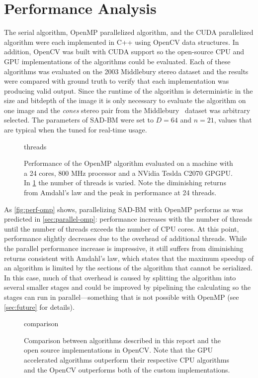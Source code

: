 \documentclass{article}
\let\orgautoref\autoref
\providecommand{\Cref}
        {\def\equationautorefname{Equation}%
         \def\figureautorefname{Figure}%
         \def\subfigureautorefname{Figure}%
         \def\Itemautorefname{Item}%
         \def\tableautorefname{Table}%
         \def\sectionautorefname{Section}%
         \def\subsectionautorefname{Section}%
         \def\subsubsectionautorefname{Section}%
         \def\chapterautorefname{Section}%
         \def\partautorefname{Part}%
         \orgautoref}
\begin{document}
\section{Performance Analysis}
\label{sec:perf}
The serial algorithm, OpenMP parallelized algorithm, and the CUDA parallelized
algorithm were each implemented in C++ using OpenCV data structures. In
addition, OpenCV was built with CUDA support so the open-source CPU and GPU
implementations of the algorithms could be evaluated. Each of these algorithms
was evaluated on the 2003 Middlebury stereo dataset and the results were
compared with ground truth to verify that each implementation was producing
valid output. Since the runtime of the algorithm is deterministic in the size
and bitdepth of the image it is only necessary to evaluate the algorithm on one
image and the \textit{cones} stereo pair from the
Middlebury~\cite{scharstein2003} dataset was arbitrary selected. The parameters
of SAD-BM were set to $D = 64$ and $n = 21$, values that are typical when the
tuned for real-time usage.

\begin{figure}
    \centering
    {threads}
    \caption{
        Performance of the OpenMP algorithm evaluated on a machine with a 24
        cores, 800 MHz processor and a NVidia Teslda C2070 GPGPU. In
        \ref{fig:perf-omp} the number of threads is varied. Note the
        diminishing returns from Amdahl's law and the peak in performance at 24
        threads.
    }
    \label{fig:perf-omp}
\end{figure}

As \Cref{fig:perf-omp} shows, parallelizing SAD-BM with OpenMP performs as was
predicted in \Cref{sec:parallel-omp}: performance increases with the number of
threads until the number of threads exceeds the number of CPU cores. At this
point, performance slightly decreases due to the overhead of additional
threads.  While the parallel performance increase is impressive, it still
suffers from diminishing returns consistent with Amdahl's law, which states
that the maximum speedup of an algorithm is limited by the sections of the
algorithm that cannot be serialized. In this case, much of that overhead is
caused by splitting the algorithm into several smaller stages and could be
improved by pipelining the calculating so the stages can run in
parallel---something that is not possible with OpenMP (see \Cref{sec:future}
for details).

\begin{figure}
    \centering
    {comparison}
    \caption{
        Comparison between algorithms described in this report and the open
        source implementations in OpenCV. Note that the GPU accelerated
        algorithms outperform their respective CPU algorithms and the OpenCV
        outperforms both of the custom implementations.
    }
    \label{fig:perf-comp}
\end{figure}
\end{document}

